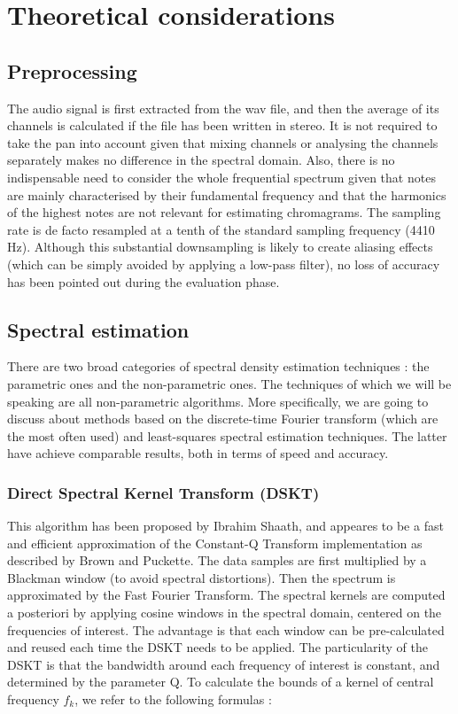 \documentclass[letterpaper]{article}
\begin{document}
\section{Theoretical considerations}

\subsection{Preprocessing}

The audio signal is first extracted from the wav file, and then the average of its channels is calculated
if the file has been written in stereo. It is not required to take the pan into account given that mixing
channels or analysing the channels separately makes no difference in the spectral domain. Also, there is
no indispensable need to consider the whole frequential spectrum given that notes are mainly characterised 
by their fundamental frequency
and that the harmonics of the highest notes are not relevant for estimating chromagrams.
The sampling rate is de facto resampled at a tenth of the standard sampling frequency (4410 Hz).
Although this substantial downsampling is likely to create aliasing effects (which can be simply avoided by 
applying a low-pass filter), no loss of accuracy has been pointed out during the evaluation phase.

\subsection{Spectral estimation}

There are two broad categories of spectral density estimation techniques : the parametric ones and the non-parametric ones. \citep{MHH} The techniques
of which we will be speaking are all non-parametric algorithms. More specifically, we are going to discuss about methods based on the discrete-time Fourier transform (which are the most often used) and least-squares spectral estimation techniques. The latter have achieve comparable results, both in terms of speed and accuracy.

\subsubsection{Direct Spectral Kernel Transform (DSKT)}

This algorithm has been proposed by Ibrahim Sha\textquotesingle ath, and appeares to be a fast and efficient approximation of the Constant-Q Transform implementation as described by Brown and Puckette.
The data samples are first multiplied by a Blackman window (to avoid spectral distortions). Then the spectrum is approximated by the Fast Fourier Transform.
The spectral kernels are computed a posteriori by applying cosine windows in the spectral domain, centered on the frequencies of interest. The advantage is that each window can be pre-calculated and reused each time the DSKT needs to be applied. The particularity of the DSKT is that the bandwidth around each frequency of interest is constant, and determined by the parameter Q. To calculate the bounds of a kernel of central frequency $ f_k $, we refer to the following formulas :
\end{document}
